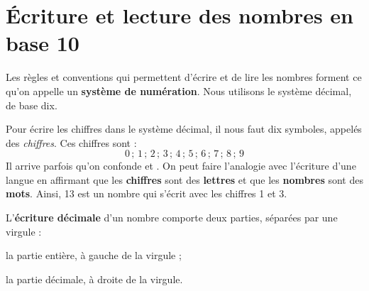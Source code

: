 \section{\'Ecriture et lecture des nombres en base 10}


Les règles et conventions qui permettent d'écrire et de lire les nombres forment ce qu'on appelle un \textbf{système de numération}. Nous utilisons le système décimal, de base dix.

\begin{aconnaitre}
Pour écrire les chiffres dans le système décimal, il nous faut dix symboles, appelés des \emph{chiffres}. Ces chiffres sont :
\[ 0\,;\,1\,;\,2\,;\,3\,;\,4\,;\,5\,;\,6\,;\,7\,;\,8\,;\,9  \]
Il arrive parfois qu'on confonde \textbf{} et \textbf{}. On peut faire l'analogie avec l'écriture d'une langue en affirmant que les \textbf{chiffres} sont des \textbf{lettres} et que les \textbf{nombres} sont des \textbf{mots}. Ainsi, 13 est un nombre qui s'écrit avec les chiffres 1 et 3.
\end{aconnaitre}

\vspace{2em}

L'\textbf{écriture décimale} d'un nombre comporte deux parties, séparées par une virgule :

\hspace{2em}\textbullet\hspace{.25em} la partie entière, à gauche de la virgule ;

\hspace{2em}\textbullet\hspace{.25em} la partie décimale, à droite de la virgule.



